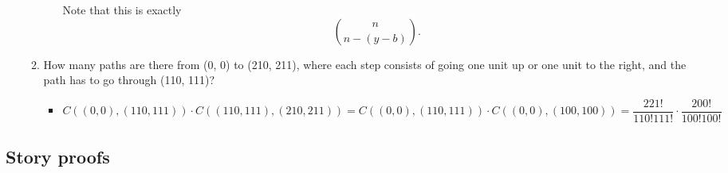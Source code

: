 \documentclass{article}
\begin{document}
\begin{enumerate}
\begin{enumerate}
\begin{itemize}
					Note that this is exactly
					$$
					\binom{n}{n - (y - b)}.
					$$
				\end{itemize}
			\item How many paths are there from (0, 0) to (210, 211), where each step consists of going one unit up or one unit to the right, and the path has to go through (110, 111)?
				\begin{itemize}
					\item
					$$
					C((0, 0), (110, 111)) \cdot C((110, 111), (210, 211)) = C((0, 0), (110, 111)) \cdot C((0, 0), (100, 100)) = \frac{221!}{110!111!} \cdot \frac{200!}{100!100!}
					$$
				\end{itemize}
		\end{enumerate}
\end{enumerate}

\subsection{Story proofs}
\end{document}
